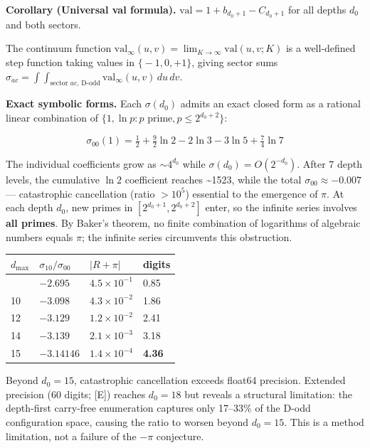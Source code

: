 \documentclass[
  11pt,
]{article}
\begin{document}
\textbf{Corollary (Universal val formula).}
\(\text{val} = 1 + b_{d_0+1} - C_{d_0+1}\) for all depths \(d_0\) and both
sectors.

The continuum function
\(\text{val}_\infty(u,v) = \lim_{K \to \infty} \text{val}(u,v;K)\) is a
well-defined step function taking values in \(\lbrace{}-1,0,+1\rbrace{}\),
giving sector sums
\(\sigma_{ac} = \int\!\!\int_{\text{sector } ac,\, \text{D-odd}} \text{val}_\infty(u,v)\, du\, dv\).

\textbf{Exact symbolic forms.} Each \(\sigma(d_0)\) admits an exact closed form
as a rational linear combination of
\(\lbrace{}1, \ln p : p \text{ prime}, p \leq 2^{d_0+2}\rbrace{}\):

\[\sigma_{00}(1) = \tfrac{1}{2} + \tfrac{9}{2}\ln 2 - 2\ln 3 - 3\ln 5 + \tfrac{7}{4}\ln 7\]

The individual coefficients grow as \(\sim 4^{d_0}\) while
\(\sigma(d_0) = O(2^{-d_0})\). After 7 depth levels, the cumulative \(\ln 2\)
coefficient reaches \textasciitilde1523, while the total
\(\sigma_{00} \approx -0.007\) --- catastrophic cancellation (ratio \(> 10^5\))
essential to the emergence of \(\pi\). At each depth \(d_0\), new primes in
\([2^{d_0+1}, 2^{d_0+2}]\) enter, so the infinite series involves \textbf{all
primes}. By Baker's theorem, no finite combination of logarithms of algebraic
numbers equals \(\pi\); the infinite series circumvents this obstruction.

\begin{longtable}[]{@{}llll@{}}
\toprule\noalign{}
\(d_{\max}\) & \(\sigma_{10}/\sigma_{00}\) & \(\lvert R + \pi \rvert\) &
digits \\
\midrule\noalign{}
\endhead
\bottomrule\noalign{}
\endlastfoot
5 & \(-2.695\) & \(4.5 \times 10^{-1}\) & 0.85 \\
10 & \(-3.098\) & \(4.3 \times 10^{-2}\) & 1.86 \\
12 & \(-3.129\) & \(1.2 \times 10^{-2}\) & 2.41 \\
14 & \(-3.139\) & \(2.1 \times 10^{-3}\) & 3.18 \\
15 & \(-3.14146\) & \(1.4 \times 10^{-4}\) & \textbf{4.36} \\
\end{longtable}

Beyond \(d_0 = 15\), catastrophic cancellation exceeds float64 precision.
Extended precision (60 digits; {[}E{]}) reaches \(d_0 = 18\) but reveals a
structural limitation: the depth-first carry-free enumeration captures only
17--33\% of the D-odd configuration space, causing the ratio to worsen beyond
\(d_0 = 15\). This is a method limitation, not a failure of the \(-\pi\)
conjecture.
\end{document}
